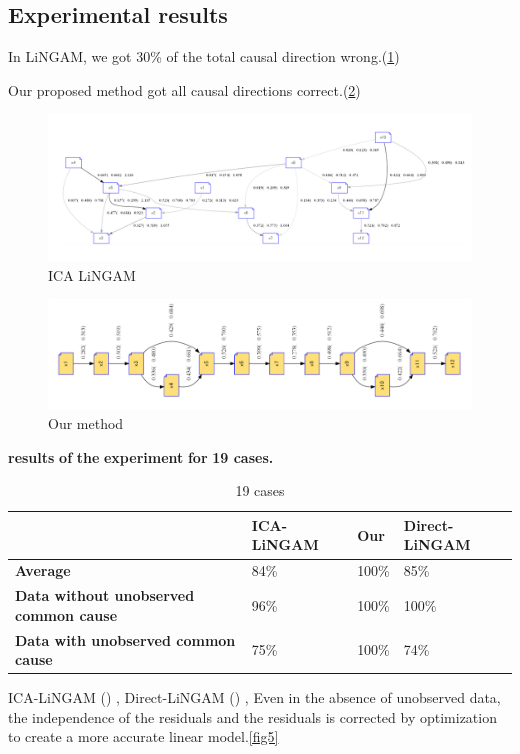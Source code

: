 \documentclass[pdftex]{article}
\begin{document}
\subsection{Experimental results}
In LiNGAM, we got 30\% of the total causal direction wrong.(\ref{fig3})
\par
Our proposed method got all causal directions correct.(\ref{fig4})
\begin{figure}[H]
	\centering
	\includegraphics[width=15cm]{fig3.png}
	\caption{ICA LiNGAM}
	\label{fig3}
\end{figure}

\begin{figure}[H]
	\centering
	\includegraphics[width=15cm]{fig4.png}
	\caption{Our method}
	\label{fig4}
\end{figure}

\centerline{\textbf{results} \textbf{of} \textbf{the} \textbf{experiment} \textbf{for} \textbf{19 cases.}}


\begin{table}[H]
\caption{ 19 cases}
\begin{tabular}{l|l|l|l|}
\cline{2-4}
                                                                    & \textbf{ICA-LiNGAM} & \textbf{Our} & \textbf{Direct-LiNGAM} \\ \hline
\multicolumn{1}{|l|}{\textbf{Average}}                              & 84\%                & 100\%        & 85\%                   \\ \hline
\multicolumn{1}{|l|}{\textbf{Data without unobserved common cause}} & 96\%                & 100\%        & 100\%                  \\ \hline
\multicolumn{1}{|l|}{\textbf{Data with unobserved common cause}}    & 75\%                & 100\%        & 74\%                   \\ \hline
\end{tabular}
\label{tab:table1}
\end{table}
ICA-LiNGAM (\cite{shimizu2006linear}) , Direct-LiNGAM (\cite{shimizu2011directlingam}) , 
Even in the absence of unobserved data, the independence of the residuals and the residuals is corrected by optimization to create a more accurate linear model.\ref{fig5}
\end{document}
